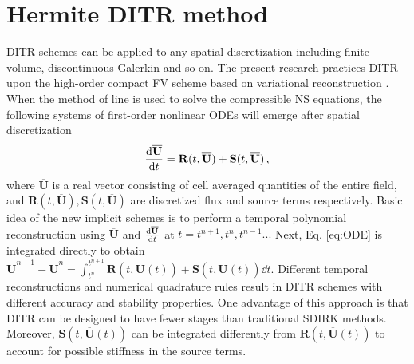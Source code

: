 \documentclass[10pt]{article}
\newcommand{\SRC}{\mathbf{S}}
\newcommand{\FF}{\mathbf{F}}
\newcommand{\uu}{\overline{\mathbf{U}}}
\newcommand{\R}{\mathbf{R}}
\begin{document}
\section{Hermite DITR method}

DITR schemes can be applied to any spatial discretization including
finite volume, discontinuous Galerkin and so on.
The present research practices DITR upon the high-order compact FV
scheme based on variational reconstruction \cite{wang2017compact_VR}.
When the method of line is used to solve the compressible
NS equations,
the following systems of first-order nonlinear ODEs
will emerge after spatial discretization
\begin{equation}
  \label{eq:ODE}
  \dv{\uu}{t} = \R(t, \uu)+\SRC(t, \uu)\,,
\end{equation}
where $\uu$ is a real vector consisting of cell averaged quantities of
the entire field, and $\R(t, \uu),\SRC(t, \uu)$ are discretized flux and source terms respectively.
Basic idea of the new implicit schemes is to perform
a temporal polynomial reconstruction using $\uu$ and $\dv{\uu}{t}$
at $t=t^{n+1}, t^{n}, t^{n-1}...$ Next, Eq. \eqref{eq:ODE} is integrated
directly to obtain 
\(
  \uu^{n+1} - \uu^{n} = \int_{t^n}^{t^{n+1}}{\R(t,\uu(t))+\SRC(t,\uu(t))\dd{t}}
\).
Different temporal reconstructions and numerical quadrature rules
result in DITR schemes with different accuracy and stability properties.
One advantage of this approach is that DITR can be designed 
to have fewer stages than traditional SDIRK methods.
Moreover, $\SRC(t,\uu(t))$ can be
integrated differently from $\R(t,\uu(t))$ to account for possible 
stiffness in the source terms.
\end{document}
